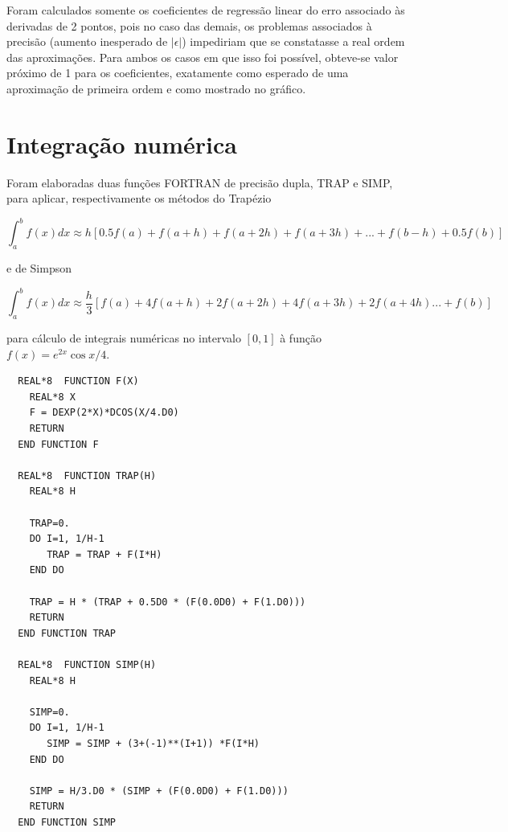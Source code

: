 \documentclass{article}
\begin{document}
Foram calculados somente os coeficientes de regressão linear do erro associado às derivadas de 2 pontos, pois no caso das demais, os problemas associados à precisão (aumento inesperado de $|\epsilon|$) impediriam que se constatasse a real ordem das aproximações. Para ambos os casos em que isso foi possível, obteve-se valor próximo de 1 para os coeficientes, exatamente como esperado de uma aproximação de primeira ordem e como mostrado no gráfico.

\section{Integração numérica}
Foram elaboradas duas funções FORTRAN de precisão dupla, TRAP e SIMP, para aplicar, respectivamente os métodos do Trapézio

\[\int_{a}^{b}f(x)dx \approx h [0.5f (a) + f (a + h) + f (a + 2h) + f (a + 3h) + . . . + f (b - h) + 0.5f (b)]\]

 e de Simpson

\[\int_{a}^{b}f(x)dx \approx \frac{h}{3}[f (a) + 4f (a + h) + 2f (a + 2h) + 4f (a + 3h) + 2f (a + 4h). . . + f (b)]\]

para cálculo de integrais numéricas no intervalo $[0,1]$ à função $f(x) = e^{2x}\cos{x/4}$.\par

\begin{lstlisting}
  REAL*8  FUNCTION F(X)
    REAL*8 X
    F = DEXP(2*X)*DCOS(X/4.D0)
    RETURN
  END FUNCTION F
  
  REAL*8  FUNCTION TRAP(H)
    REAL*8 H
    
    TRAP=0.
    DO I=1, 1/H-1
       TRAP = TRAP + F(I*H)
    END DO
    
    TRAP = H * (TRAP + 0.5D0 * (F(0.0D0) + F(1.D0)))
    RETURN
  END FUNCTION TRAP
  
  REAL*8  FUNCTION SIMP(H)
    REAL*8 H
    
    SIMP=0.
    DO I=1, 1/H-1
       SIMP = SIMP + (3+(-1)**(I+1)) *F(I*H)
    END DO
    
    SIMP = H/3.D0 * (SIMP + (F(0.0D0) + F(1.D0)))
    RETURN
  END FUNCTION SIMP

\end{lstlisting}
\end{document}
